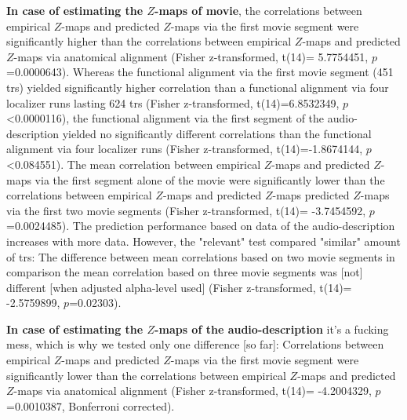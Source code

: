 \textbf{In case of estimating the $Z$-maps of movie}, the correlations between
empirical $Z$-maps and predicted $Z$-maps via the first movie segment were
significantly higher than the correlations between empirical $Z$-maps and
predicted $Z$-maps via anatomical alignment (Fisher z-transformed, t(14)=
5.7754451, $p$=0.0000643).
%
Whereas the functional alignment via the first movie segment (451 \acp{tr})
yielded significantly higher correlation than a functional alignment via four
localizer runs lasting 624 \acp{tr} (Fisher z-transformed, t(14)=6.8532349,
$p$<0.0000116),
%
the functional alignment via the first segment of the audio-description yielded
no significantly different correlations than the functional alignment via four
localizer runs (Fisher z-transformed, t(14)=-1.8674144, $p$<0.084551).
%
The mean correlation between empirical $Z$-maps and predicted $Z$-maps via the
first segment alone of the movie were significantly lower than the correlations
between empirical $Z$-maps and predicted $Z$-maps predicted $Z$-maps via the
first two movie segments (Fisher z-transformed, t(14)= -3.7454592,
$p$=0.0024485).
%
The prediction performance based on data of the audio-description
increases with more data. However, the "relevant" test compared "similar" amount
of \acp{tr}:
%
The difference between mean correlations based on two movie segments in
comparison the mean correlation based on three movie segments was [not]
different [when adjusted alpha-level used] (Fisher z-transformed, t(14)=
-2.5759899, $p$=0.02303).







\textbf{In case of estimating the $Z$-maps of the audio-description} it's a
fucking mess, which is why we tested only one difference [so far]:
%
Correlations between empirical $Z$-maps and predicted $Z$-maps via the first
movie segment were significantly lower than the correlations between empirical
$Z$-maps and predicted $Z$-maps via anatomical alignment (Fisher z-transformed,
t(14)= -4.2004329, $p$=0.0010387, Bonferroni corrected).


